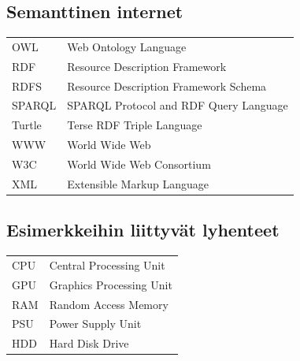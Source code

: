 \documentclass[finnish, 12pt, a4paper, elec, utf8, pdfa, online]{aaltothesis}
\begin{document}
\thesistableofcontents



\subsection*{Semanttinen internet}
\begin{tabular}{ll}
OWL          & Web Ontology Language \\
RDF          & Resource Description Framework \\
RDFS         & Resource Description Framework Schema\\
SPARQL       & SPARQL Protocol and RDF Query Language \\
Turtle       & Terse RDF Triple Language \\
WWW          & World Wide Web \\
W3C          & World Wide Web Consortium \\
XML          & Extensible Markup Language \\
\end{tabular}

\subsection*{Esimerkkeihin liittyvät lyhenteet}
\begin{tabular}{ll}
CPU          & Central Processing Unit \\
GPU          & Graphics Processing Unit \\
RAM          & Random Access Memory \\
PSU          & Power Supply Unit \\
HDD          & Hard Disk Drive \\
\end{tabular}

\cleardoublepage


\end{document}
